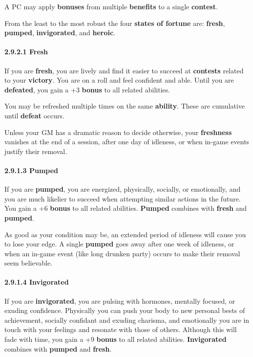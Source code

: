 \documentclass[
]{article}
\begin{document}
A PC may apply \textbf{bonuses} from multiple \textbf{benefits} to a
single \textbf{contest}.

From the least to the most robust the four \textbf{states of fortune}
are: \textbf{fresh}, \textbf{pumped}, \textbf{invigorated}, and
\textbf{heroic}.

\hypertarget{fresh}{%
\paragraph{2.9.2.1 Fresh}\label{fresh}}

If you are \textbf{fresh}, you are lively and find it easier to succeed
at \textbf{contests} related to your \textbf{victory}. You are on a roll
and feel confident and able. Until you are \textbf{defeated}, you gain a
+3 \textbf{bonus} to all related abilities.

You may be refreshed multiple times on the same \textbf{ability}. These
are cumulative until \textbf{defeat} occurs.

Unless your GM has a dramatic reason to decide otherwise, your
\textbf{freshness} vanishes at the end of a session, after one day of
idleness, or when in-game events justify their removal.

\hypertarget{pumped}{%
\paragraph{2.9.1.3 Pumped}\label{pumped}}

If you are \textbf{pumped}, you are energized, physically, socially, or
emotionally, and you are much likelier to succeed when attempting
similar actions in the future. You gain a +6 \textbf{bonus} to all
related abilities. \textbf{Pumped} combines with \textbf{fresh} and
\textbf{pumped}.

As good as your condition may be, an extended period of idleness will
cause you to lose your edge. A single \textbf{pumped} goes away after
one week of idleness, or when an in-game event (like long drunken party)
occurs to make their removal seem believable.

\hypertarget{invigorated}{%
\paragraph{2.9.1.4 Invigorated}\label{invigorated}}

If you are \textbf{invigorated}, you are pulsing with hormones, mentally
focused, or exuding confidence. Physically you can push your body to new
personal bests of achievement, socially confidant and exuding charisma,
and emotionally you are in touch with your feelings and resonate with
those of others. Although this will fade with time, you gain a +9
\textbf{bonus} to all related abilities. \textbf{Invigorated} combines
with \textbf{pumped} and \textbf{fresh}.
\end{document}
